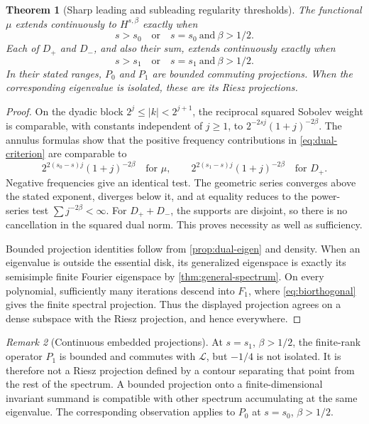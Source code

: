 \documentclass[11pt,a4paper]{article}
\newtheorem{theorem}{Theorem}[section]
\theoremstyle{definition}
\theoremstyle{remark}
\newtheorem{remark}[theorem]{Remark}
\newcommand{\Lop}{\mathcal L}
\numberwithin{equation}{section}
\begin{document}
\begin{theorem}[Sharp leading and subleading regularity thresholds]
\label{thm:dual-thresholds}
The functional $\mu$ extends continuously to $H^{s,\beta}$ exactly when
\begin{equation}
 s>s_0\quad\text{or}\quad s=s_0\ \text{and}\ \beta>1/2.
 \label{eq:mu-threshold}
\end{equation}
Each of $D_+$ and $D_-$, and also their sum, extends continuously exactly
when
\begin{equation}
 s>s_1\quad\text{or}\quad s=s_1\ \text{and}\ \beta>1/2.
 \label{eq:D-threshold}
\end{equation}
In their stated ranges, $P_0$ and $P_1$ are bounded commuting projections.
When the corresponding eigenvalue is isolated, these are its Riesz
projections.
\end{theorem}
\begin{proof}
On the dyadic block $2^j\le|k|<2^{j+1}$, the reciprocal squared Sobolev
weight is comparable, with constants independent of $j\ge1$, to
$2^{-2sj}(1+j)^{-2\beta}$. The annulus formulas show that the positive
frequency contributions in \eqref{eq:dual-criterion} are comparable to
\begin{equation}
 2^{2(s_0-s)j}(1+j)^{-2\beta}\quad\text{for }\mu,
 \qquad
 2^{2(s_1-s)j}(1+j)^{-2\beta}\quad\text{for }D_+.
 \label{eq:block-dual-tests}
\end{equation}
Negative frequencies give an identical test. The geometric series
converges above the stated exponent, diverges below it, and at equality
reduces to the power-series test $\sum j^{-2\beta}<\infty$.
For $D_++D_-$, the supports are disjoint, so there is no cancellation in
the squared dual norm. This proves necessity as well as sufficiency.

Bounded projection identities follow from \cref{prop:dual-eigen} and
density. When an eigenvalue is outside the essential disk, its generalized
eigenspace is exactly its semisimple finite Fourier eigenspace by
\cref{thm:general-spectrum}. On every polynomial, sufficiently many
iterations descend into $F_1$, where \eqref{eq:biorthogonal} gives the
finite spectral projection. Thus the displayed projection agrees on a
dense subspace with the Riesz projection, and hence everywhere.
\end{proof}

\begin{remark}[Continuous embedded projections]
At $s=s_1$, $\beta>1/2$, the finite-rank operator $P_1$ is bounded and
commutes with $\Lop$, but $-1/4$ is not isolated. It is therefore not a
Riesz projection defined by a contour separating that point from the
rest of the spectrum. A bounded projection onto a finite-dimensional
invariant summand is compatible with other spectrum accumulating at the
same eigenvalue. The corresponding observation applies to $P_0$ at
$s=s_0$, $\beta>1/2$.
\end{remark}
\end{document}
